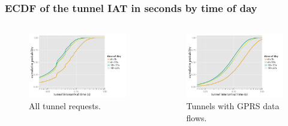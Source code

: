\documentclass{beamer}
\begin{document}
\begin{frame}
	\frametitle{ECDF of the tunnel IAT in seconds by time of day}
	\begin{columns}
		\begin{figure}
			\includegraphics[width=0.7\columnwidth]{../../chapters/041-mobilenetsmeasuring/images/R-IAT-successful-2h-ecdfs.pdf}
			\vspace{-4mm}
			\caption{All tunnel requests.}
		\end{figure}
		\vspace{-10mm}
		\begin{figure}
			\includegraphics[width=0.7\columnwidth]{../../chapters/041-mobilenetsmeasuring/images/R-IAT-fromflows-gprs-ecdfs-2h.pdf}
			\vspace{-4mm}
			\caption{Tunnels with GPRS data flows.}
		\end{figure}


\end{columns}
\end{frame}
\end{document}
